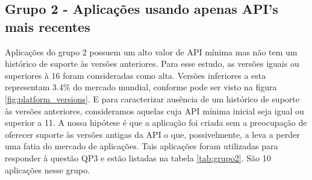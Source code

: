 \subsection{Grupo 2 - Aplicações usando apenas API's mais recentes}
Aplicações do grupo 2 possuem um alto valor de API mínima mas não tem um histórico de suporte
às versões anteriores. Para esse estudo, as versões iguais ou superiores à 16 foram consideradas
como alta. Versões inferiores a esta representam 3.4\% do mercado mundial, conforme pode ser visto
na figura \ref{fig:platform_versions}. E para caracterizar ausência de um histórico de suporte
às versões anteriores,
consideramos aquelas cuja API mínima inicial seja igual ou superior a 11. A nossa hipótese é que
a aplicação foi criada sem a preocupação de oferecer suporte às versões antigas da API o que,
possivelmente, a leva a perder uma fatia do mercado de aplicações. Tais aplicações foram utilizadas
para responder à questão QP3 e estão listadas na tabela \ref{tab:grupo2}. São 10 aplicações nesse grupo.

